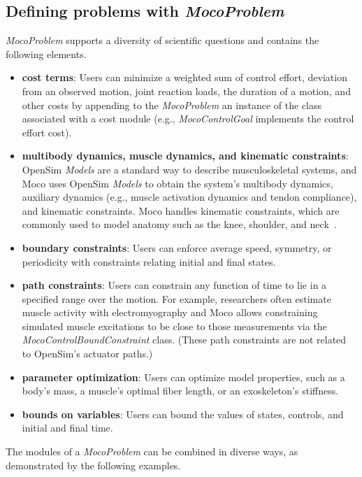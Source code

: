 \documentclass[10pt,letterpaper]{article}
\begin{document}
\subsection*{Defining problems with \textit{MocoProblem}}

\textit{MocoProblem} supports a diversity of scientific questions and contains the following elements.
\begin{itemize}
\item \textbf{cost terms}: Users can minimize a weighted sum of control effort, deviation from an observed motion, joint reaction loads, the duration of a motion, and other costs by appending to the \textit{MocoProblem} an instance of the class associated with a cost module (e.g., \textit{MocoControlGoal} implements the control effort cost).
\item \textbf{multibody dynamics, muscle dynamics, and kinematic constraints}: OpenSim \textit{Models} are a standard way to describe musculoskeletal systems, and Moco uses OpenSim \textit{Models} to obtain the system's multibody dynamics, auxiliary dynamics (e.g., muscle activation dynamics and tendon compliance), and kinematic constraints. Moco handles kinematic constraints, which are commonly used to model anatomy such as the knee, shoulder, and neck~\cite{Seth:2016,Lerner:2015,Rajagopal:2016ek,Cazzola:2017}.
\item \textbf{boundary constraints}: Users can enforce average speed, symmetry, or periodicity with constraints relating initial and final states.
\item \textbf{path constraints}: Users can constrain any function of time to lie in a specified range over the motion. For example, researchers often estimate muscle activity with electromyography and Moco allows constraining simulated muscle excitations to be close to those measurements via the \textit{MocoControlBoundConstraint} class. (These path constraints are not related to OpenSim's actuator paths.)
\item \textbf{parameter optimization}: Users can optimize model properties, such as a body's mass, a muscle's optimal fiber length, or an exoskeleton's stiffness.
\item \textbf{bounds on variables}: Users can bound the values of states, controls, and initial and final time.
\end{itemize}
The modules of a \textit{MocoProblem} can be combined in diverse ways, as demonstrated by the following examples.
\end{document}
